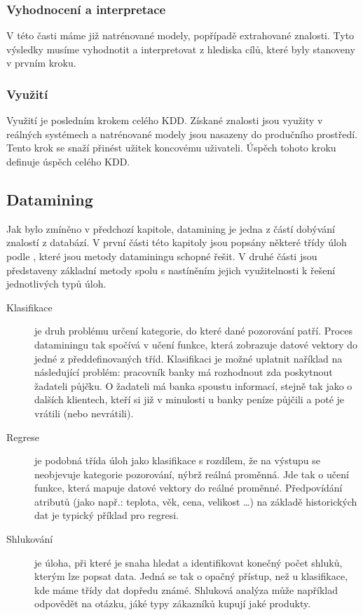 \documentclass[thesis=M,czech]{FITthesis}[2012/06/26]
\begin{document}
\subsubsection*{Vyhodnocení a interpretace}
V této časti máme již natrénované modely, popřípadě extrahované znalosti. Tyto výsledky musíme vyhodnotit a interpretovat z hlediska cílů, které byly stanoveny v prvním kroku.

\subsubsection*{Využití}
Využití je posledním krokem celého KDD. Získané znalosti jsou využity v reálných systémech a natrénované modely jsou nasazeny do produčního prostředí. Tento krok se snaží přinést užitek koncovému uživateli. Úspěch tohoto kroku definuje úspěch celého KDD.	
	

\subsection{Datamining}
Jak bylo zmíněno v předchozí kapitole, datamining je jedna z částí dobývání znalostí z databází. V první části této kapitoly jsou popsány některé třídy úloh podle \cite{fayyad}, které jsou metody dataminingu schopné řešit. V druhé části jsou představeny základní metody spolu s nastíněním jejich využitelnosti k řešení jednotlivých typů úloh. 

\begin{description}
    \item[Klasifikace]
    
    je druh problému určení kategorie, do které dané pozorování patří. Proces dataminingu tak spočívá v učení funkce, která zobrazuje datové vektory do jedné z předdefinovaných tříd. Klasifikaci je možné uplatnit naříklad na následující problém: pracovník 
    banky má rozhodnout zda poskytnout žadateli půjčku. O žadateli má banka spoustu informací, stejně tak jako o dalších klientech, kteří si již v minulosti u banky peníze půjčili a poté je vrátili (nebo nevrátili).
    
    
    \item[Regrese]
    
    je podobná třída úloh jako klasifikace s rozdílem, že na výstupu se neobjevuje kategorie pozorování, nýbrž reálná proměnná. Jde tak o učení funkce, která mapuje datové vektory do reálné proměnné. Předpovídání atributů (jako např.: teplota, věk, cena, velikost \dots) na základě historických dat je typický příklad pro regresi.
    

   \item[Shlukování]
   
   je úloha, při které je snaha hledat a identifikovat konečný počet shluků, kterým lze popsat data. Jedná se tak o opačný přístup, než u klasifikace, kde máme třídy dat dopředu známé. Shluková analýza může například odpovědět na otázku, jáké typy zákazníků kupují jaké produkty.
   
\end{description}
\end{document}

